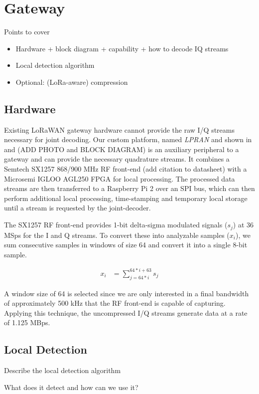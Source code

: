 \section{Gateway}
\label{sec:gateway}

{\color{blue} Points to cover
\begin{itemize}
    \item Hardware + block diagram + capability + how to decode IQ streams
    \item Local detection algorithm
    \item Optional: (LoRa-aware) compression
\end{itemize}

}

\subsection{Hardware}
\label{sec:hardware}

Existing LoRaWAN gateway hardware cannot provide the raw I/Q streams necessary
for joint decoding. Our custom platform, named \textit{LPRAN} and shown in
 and  {\color{blue} (ADD PHOTO and
BLOCK DIAGRAM)} is an auxiliary peripheral to a gateway and can provide the
necessary quadrature streams. It combines a Semtech SX1257 868/900 MHz RF
front-end {\color{blue} (add citation to datasheet)} with a Microsemi IGLOO
AGL250 FPGA for local processing. The processed data streams are then
transferred to a Raspberry Pi 2 over an SPI bus, which can then perform
additional local processing, time-stamping and temporary local storage until a
stream is requested by the joint-decoder.

The SX1257 RF front-end provides 1-bit delta-sigma modulated signals ($s_j$)
at 36 MSps for the I and Q streams. To convert these into analyzable samples
($x_i$), we sum consecutive samples in windows of size 64 and convert it into
a single 8-bit sample.

\begin{align*}
x_i &= \sum_{j=64*i}^{64*i + 63} s_j
\end{align*}

A window size of 64 is selected since we are only interested in a final
bandwidth of approximately 500 kHz that the RF front-end is capable of
capturing. Applying this technique, the uncompressed I/Q streams generate data
at a rate of 1.125 MBps.

\subsection{Local Detection}
\label{sec:local-detection}

{\color{blue}

Describe the local detection algorithm

What does it detect and how can we use it?

}